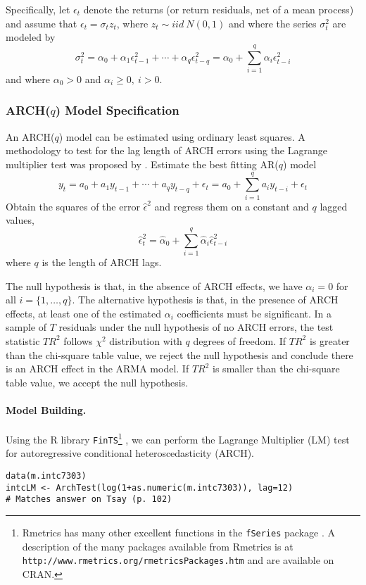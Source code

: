 Specifically, let $\epsilon_t$  denote the returns (or return residuals, net of a mean process) and assume that $\epsilon_t=\sigma_t z_t$, where $z_t\sim iid~ N(0,1)$  and where the series $\sigma_t^2$  are modeled by
\[
\sigma_t^2=\alpha_0+\alpha_1 \epsilon_{t-1}^2+\cdots+\alpha_q \epsilon_{t-q}^2 = \alpha_0 + \sum_{i=1}^q \alpha_{i} \epsilon_{t-i}^2 
\]
and where $\alpha_0>0$  and $\alpha_i\ge 0,~i>0$.

\subsubsection{ARCH($q$) Model Specification}

An ARCH($q$) model can be estimated using ordinary least squares. A methodology to test for the lag length of ARCH errors using the Lagrange multiplier test was proposed by . Estimate the best fitting AR($q$) model
\[
y_t = a_0 + a_1 y_{t-1} + \cdots + a_q y_{t-q} + \epsilon_t = a_0 + \sum_{i=1}^q a_i y_{t-i} + \epsilon_t 
\]
Obtain the squares of the error $\hat{\epsilon}^2$  and regress them on a constant and $q$ lagged values,
\[
\hat \epsilon_t^2 = \hat \alpha_0 + \sum_{i=1}^{q} \hat \alpha_i \hat \epsilon_{t-i}^2
\]
where $q$ is the length of ARCH lags.

The null hypothesis is that, in the absence of ARCH effects, we have $\alpha_i = 0$ for all $i = \{1, \ldots, q\}$. The alternative hypothesis is that, in the presence of ARCH effects, at least one of the estimated $\alpha_i$ coefficients must be significant. In a sample of $T$ residuals under the null hypothesis of no ARCH errors, the test statistic $TR^2$ follows $\chi^2$ distribution with $q$ degrees of freedom. If $TR^2$ is greater than the chi-square table value, we reject the null hypothesis and conclude there is an ARCH effect in the ARMA model. If $TR^2$ is smaller than the chi-square table value, we accept the null hypothesis.

\paragraph{Model Building.}
Using the R library \texttt{FinTS}\footnote{Rmetrics has many other excellent functions in the \texttt{fSeries} package \cite{fseries-R}. A description of the many packages available from Rmetrics is at \texttt{http://www.rmetrics.org/rmetricsPackages.htm} and are available on CRAN.}
\cite{fints-R}, we can perform the Lagrange Multiplier (LM) test for autoregressive conditional heteroscedasticity (ARCH).
\begin{verbatim}
data(m.intc7303)
intcLM <- ArchTest(log(1+as.numeric(m.intc7303)), lag=12)
# Matches answer on Tsay (p. 102)
\end{verbatim}

